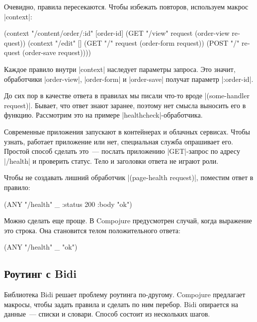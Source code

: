 Очевидно, правила пересекаются. Чтобы избежать повторов, используем макрос
\spverb|context|:

\begin{english}
  \begin{clojure}
(context "/content/order/:id" [order-id]
  (GET  "/view" request (order-view request))
  (context "/edit" []
    (GET  "/" request (order-form request))
    (POST "/" request (order-save request))))
  \end{clojure}
\end{english}

Каждое правило внутри \spverb|context| наследует параметры запроса. Это значит,
обработчики \spverb|order-view|, \spverb|order-form| и \spverb|order-save|
получат параметр \spverb|:order-id|.

До сих пор в качестве ответа в правилах мы писали что-то вроде
\spverb|(some-handler request)|. Бывает, что ответ знают заранее, поэтому нет
смысла выносить его в функцию. Рассмотрим это на примере
\spverb|healthcheck|-обработчика.

Современные приложения запускают в контейнерах и облачных сервисах. Чтобы
узнать, работает приложение или нет, специальная служба опрашивает его. Простой
способ сделать это~--- послать приложению \spverb|GET|-запрос по адресу
\spverb|/health| и проверить статус. Тело и заголовки ответа не играют роли.

Чтобы не создавать лишний обработчик \spverb|(page-health request)|, поместим
ответ в правило:

\begin{english}
  \begin{clojure}
(ANY "/health" _ {:status 200 :body "ok"})
  \end{clojure}
\end{english}

Можно сделать еще проще. В Compojure предусмотрен случай, когда выражение это
строка. Она становится телом положительного ответа:

\begin{english}
  \begin{clojure}
(ANY "/health" _ "ok")
  \end{clojure}
\end{english}

\subsection{Роутинг с Bidi}

Библиотека Bidi решает проблему роутинга
по-другому. Compojure предлагает макросы, чтобы задать правила и сделать по ним
перебор. Bidi опирается на данные~--- списки и словари. Способ состоит из
нескольких шагов.

